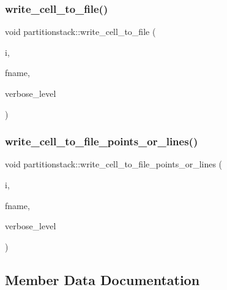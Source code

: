 \subsubsection{\texorpdfstring{write\+\_\+cell\+\_\+to\+\_\+file()}{write\_cell\_to\_file()}}
{\footnotesize\ttfamily void partitionstack\+::write\+\_\+cell\+\_\+to\+\_\+file (\begin{DoxyParamCaption}\item[{\mbox{\hyperlink{galois_8h_a09fddde158a3a20bd2dcadb609de11dc}{I\+NT}}}]{i,  }\item[{\mbox{\hyperlink{galois_8h_ab6cc7b4aeb6ea31aba2b3fbfc83ff5e6}{B\+Y\+TE}} $\ast$}]{fname,  }\item[{\mbox{\hyperlink{galois_8h_a09fddde158a3a20bd2dcadb609de11dc}{I\+NT}}}]{verbose\+\_\+level }\end{DoxyParamCaption})}

\mbox{\label{classpartitionstack_afb47d369edf798908f2d1a077c69676a}} 
\subsubsection{\texorpdfstring{write\+\_\+cell\+\_\+to\+\_\+file\+\_\+points\+\_\+or\+\_\+lines()}{write\_cell\_to\_file\_points\_or\_lines()}}
{\footnotesize\ttfamily void partitionstack\+::write\+\_\+cell\+\_\+to\+\_\+file\+\_\+points\+\_\+or\+\_\+lines (\begin{DoxyParamCaption}\item[{\mbox{\hyperlink{galois_8h_a09fddde158a3a20bd2dcadb609de11dc}{I\+NT}}}]{i,  }\item[{\mbox{\hyperlink{galois_8h_ab6cc7b4aeb6ea31aba2b3fbfc83ff5e6}{B\+Y\+TE}} $\ast$}]{fname,  }\item[{\mbox{\hyperlink{galois_8h_a09fddde158a3a20bd2dcadb609de11dc}{I\+NT}}}]{verbose\+\_\+level }\end{DoxyParamCaption})}



\subsection{Member Data Documentation}
\mbox{\label{classpartitionstack_ae7e4a5249489746c13c3997c5c7e50ad}} 
